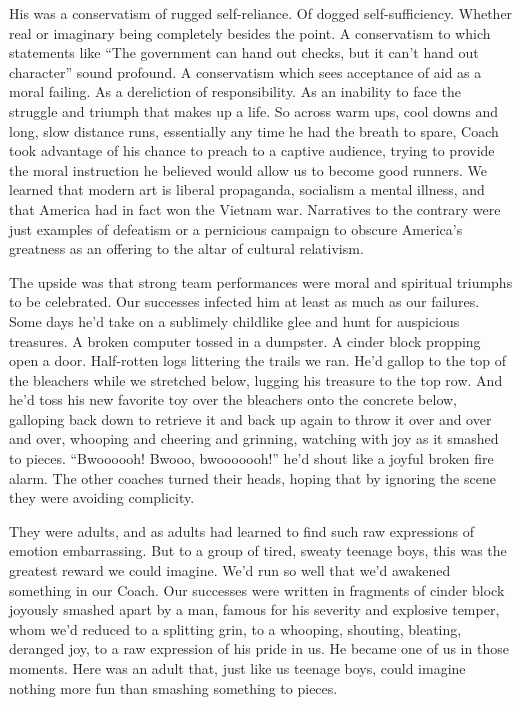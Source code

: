 \documentclass[12pt, oneside]{memoir}
\begin{document}
His was a conservatism of rugged self-reliance.
Of dogged self-sufficiency.
Whether real or imaginary being completely besides the point.
A conservatism to which statements like ``The government can hand out
checks, but it can't hand out character'' sound profound.
A conservatism which sees acceptance of aid as a moral failing.
As a dereliction of responsibility.
As an inability to face the struggle and triumph that makes up a life.
So across warm ups, cool downs and long, slow distance runs, essentially
any time he had the breath to spare, Coach took advantage of his
chance to preach to a captive audience, trying to provide the moral
instruction he believed would allow us to become good runners.
We learned that modern art is liberal propaganda, socialism a mental
illness, and that America had in fact won the Vietnam war.
Narratives to the contrary were just examples of defeatism or a
pernicious campaign to obscure America's greatness as an offering to
the altar of cultural relativism.

The upside was that strong team performances were moral and spiritual
triumphs to be celebrated.
Our successes infected him at least as much as our failures.
Some days he'd take on a sublimely childlike glee and hunt for
auspicious treasures.
A broken computer tossed in a dumpster.
A cinder block propping open a door.
Half-rotten logs littering the trails we ran.
He'd gallop to the top of the bleachers while we stretched below,
lugging his treasure to the top row.
And he'd toss his new favorite toy over the bleachers onto the
concrete below, galloping back down to retrieve it and back up again
to throw it over and over and over, whooping and cheering and
grinning, watching with joy as it smashed to pieces.
``Bwoooooh! Bwooo, bwooooooh!'' he'd shout like a joyful broken fire
alarm.
The other coaches turned their heads, hoping that by ignoring the
scene they were avoiding complicity.

They were adults, and as adults had learned to find such raw
expressions of emotion embarrassing.
But to a group of tired, sweaty teenage boys, this was the greatest
reward we could imagine.
We'd run so well that we'd awakened something in our Coach.
Our successes were written in fragments of cinder block joyously
smashed apart by a man, famous for his severity and explosive temper,
whom we'd reduced to a splitting grin, to a whooping, shouting, bleating,
deranged joy, to a raw expression of his pride in us.
He became one of us in those moments.
Here was an adult that, just like us teenage boys, could imagine
nothing more fun than smashing something to pieces.
\end{document}
